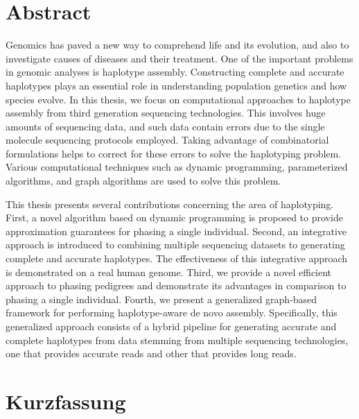 \chapter*{Abstract}

Genomics has paved a new way to comprehend life and its evolution, and also to investigate causes of diseases and their treatment.
One of the important problems in genomic analyses is haplotype assembly. Constructing complete and accurate haplotypes plays an essential role in understanding population genetics and how species evolve.
In this thesis, we focus on computational approaches to haplotype assembly from third generation sequencing technologies.
This involves huge amounts of sequencing data, and such data contain errors due to the single molecule sequencing protocols employed. 
Taking advantage of combinatorial formulations helps to correct for these errors to solve the haplotyping problem.
Various computational techniques such as dynamic programming, parameterized algorithms, and graph algorithms are used to solve this problem.

This thesis presents several contributions concerning the area of haplotyping. First, a novel algorithm based on dynamic programming is proposed to provide approximation guarantees for phasing a single individual.
Second, an integrative approach is introduced to combining multiple sequencing datasets to generating complete and accurate haplotypes.
The effectiveness of this integrative approach is demonstrated on a real human genome.
Third, we provide a novel efficient approach to phasing pedigrees and demonstrate its advantages in comparison to phasing a single individual.
Fourth, we present a generalized graph-based framework for performing haplotype-aware de novo assembly. 
Specifically, this generalized approach consists of a hybrid pipeline for generating accurate and complete haplotypes from data stemming from multiple sequencing technologies, one that provides accurate reads and other
that provides long reads.


\chapter*{Kurzfassung}

